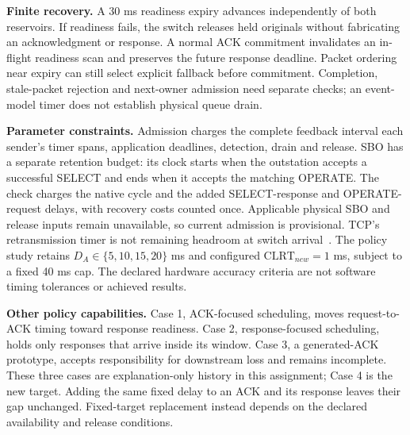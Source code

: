 \textbf{Finite recovery.} A 30 ms readiness expiry advances independently of
both reservoirs. If readiness fails, the switch releases held originals without
fabricating an acknowledgment or response. A normal ACK commitment invalidates
an in-flight readiness scan and preserves the future response deadline. Packet
ordering near expiry can still select explicit fallback before commitment.
Completion, stale-packet rejection and next-owner admission need separate checks;
an event-model timer does not establish physical queue drain.

\textbf{Parameter constraints.} Admission charges the complete feedback interval
each sender's timer spans, application deadlines, detection, drain and release.
SBO has a separate retention budget: its clock starts when the outstation accepts
a successful SELECT and ends when it accepts the matching OPERATE. The check
charges the native cycle and the added SELECT-response and OPERATE-request delays,
with recovery costs counted once. Applicable physical SBO and release inputs
remain unavailable, so current admission is provisional. TCP's retransmission
timer is not remaining headroom at switch arrival~\cite{case4_rfc6298}.
The policy study retains $D_A\in\{5,10,15,20\}$ ms and configured
$\mathrm{CLRT}_{new}=1$ ms, subject to a fixed 40 ms cap. The declared hardware
accuracy criteria are not software timing tolerances or achieved results.

\textbf{Other policy capabilities.} Case 1, ACK-focused scheduling, moves
request-to-ACK timing toward response readiness. Case 2, response-focused scheduling,
holds only responses that arrive inside its window. Case 3, a generated-ACK prototype,
accepts responsibility for downstream loss and remains incomplete. These three
cases are explanation-only history in this assignment; Case 4 is the new target.
Adding the same fixed delay to an ACK and its response leaves their gap unchanged.
Fixed-target replacement instead depends on the declared availability and release
conditions.
